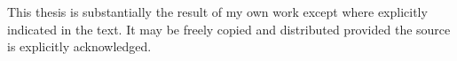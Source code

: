 \begin{singlespace}
\begin{titlepage}
        {\begin{flushleft}
        	\begin{spacing}{1.1}
        		\small This thesis is substantially the result of my own work except where explicitly indicated in the text. It may be freely copied and distributed provided the source is explicitly acknowledged.
        	\end{spacing}
       	\end{flushleft}
    	}
        
    \end{titlepage}
\end{singlespace}

%


